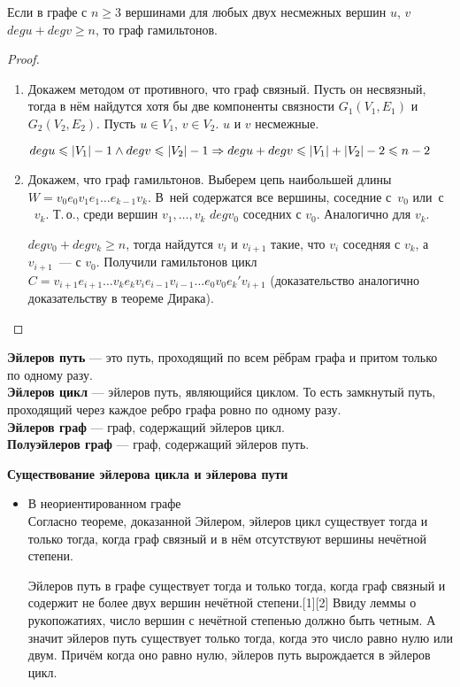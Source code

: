 \begin{theorem}[Оре, 1960]
	Если в графе с $n \geqslant 3$ вершинами для любых двух несмежных вершин $u$, $v$ $deg u + deg v \geqslant n$, то граф гамильтонов.
\end{theorem}
\begin{proof}
	\begin{enumerate}
		\item Докажем методом от противного, что граф связный. Пусть он несвязный, тогда в нём найдутся хотя бы две компоненты связности $G_1(V_1, E_1)$ и $G_2(V_2, E_2)$. Пусть $u \in V_1$, $v \in V_2$. $u$ и $v$ несмежные.
		
		$deg u \leqslant |V_1| - 1 \land deg v \leqslant |V_2| - 1 \opbr\Rightarrow deg u + deg v \opbr\leqslant |V_1| + |V_2| - 2 \opbr\leqslant n - 2$
		
		\item Докажем, что граф гамильтонов. Выберем цепь наибольшей длины $W = v_0 e_0 v_1 e_1 \ldots e_{k-1} v_k$. В~ней содержатся все вершины, соседние с~$v_0$ или~с
		~$v_k$. Т.\,о., среди вершин $v_1, \ldots, v_k$ $deg v_0$ соседних с $v_0$. Аналогично для $v_k$.
		
		$deg v_0 + deg v_k \geqslant n$, тогда найдутся $v_i$ и $v_{i+1}$ такие, что $v_i$ соседняя с $v_k$, а $v_{i+1}$~--- с $v_0$. Получили гамильтонов цикл $C = v_{i+1} e_{i+1} \ldots v_k e_k v_i e_{i-1} v_{i-1} \ldots e_0 v_0 e_k' v_{i+1}$ (доказательство аналогично доказательству в теореме Дирака).
	\end{enumerate}
\end{proof}



\textbf{Эйлеров путь} — это путь, проходящий по всем рёбрам графа и притом только по одному разу. \\
\textbf{Эйлеров цикл} — эйлеров путь, являющийся циклом. То есть замкнутый путь, проходящий через каждое ребро графа ровно по одному разу.\\
\textbf{Эйлеров граф} — граф, содержащий эйлеров цикл.\\
\textbf{Полуэйлеров граф} — граф, содержащий эйлеров путь.\\
\begin{center}
\textbf{Существование эйлерова цикла и эйлерова пути}
\end{center}
\begin{itemize}
\item В неориентированном графе\\
Согласно теореме, доказанной Эйлером, эйлеров цикл существует тогда и только тогда, когда граф связный и в нём отсутствуют вершины нечётной степени.

Эйлеров путь в графе существует тогда и только тогда, когда граф связный и содержит не более двух вершин нечётной степени.[1][2] Ввиду леммы о рукопожатиях, число вершин с нечётной степенью должно быть четным. А значит эйлеров путь существует только тогда, когда это число равно нулю или двум. Причём когда оно равно нулю, эйлеров путь вырождается в эйлеров цикл.
\end{itemize}


